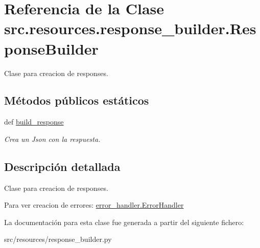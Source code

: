 \hypertarget{classsrc_1_1resources_1_1response__builder_1_1_response_builder}{\section{Referencia de la Clase src.\-resources.\-response\-\_\-builder.\-Response\-Builder}
\label{classsrc_1_1resources_1_1response__builder_1_1_response_builder}
}


Clase para creacion de responses.  


\subsection*{Métodos públicos estáticos}
\begin{DoxyCompactItemize}
\item 
\hypertarget{classsrc_1_1resources_1_1response__builder_1_1_response_builder_ac0c9842fd66095442c5f60f868d5c69b}{def \hyperlink{classsrc_1_1resources_1_1response__builder_1_1_response_builder_ac0c9842fd66095442c5f60f868d5c69b}{build\-\_\-response}}\label{classsrc_1_1resources_1_1response__builder_1_1_response_builder_ac0c9842fd66095442c5f60f868d5c69b}

\begin{DoxyCompactList}\small\item\em Crea un Json con la respuesta. \end{DoxyCompactList}\end{DoxyCompactItemize}


\subsection{Descripción detallada}
Clase para creacion de responses. 

Para ver creacion de errores\-: \hyperlink{classsrc_1_1resources_1_1error__handler_1_1_error_handler}{error\-\_\-handler.\-Error\-Handler} 

La documentación para esta clase fue generada a partir del siguiente fichero\-:\begin{DoxyCompactItemize}
\item 
src/resources/response\-\_\-builder.\-py\end{DoxyCompactItemize}

